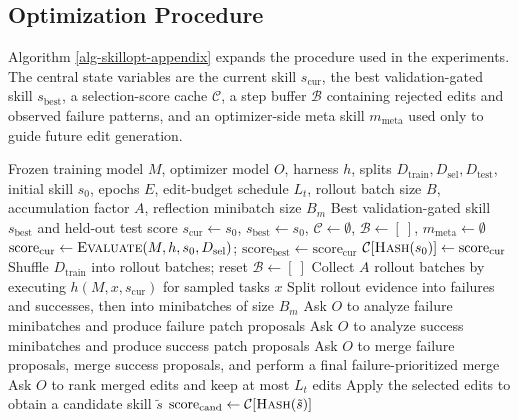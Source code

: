 \documentclass[
]{article}
\newcommand{\ourmethod}{\textsc{SkillOpt}\xspace}
\begin{document}
\subsection{Optimization Procedure}\label{sec-app-algorithm}

Algorithm \ref{alg-skillopt-appendix} expands the procedure used in the
experiments. The central state variables are the current skill
\(s_{\mathrm{cur}}\), the best validation-gated skill
\(s_{\mathrm{best}}\), a selection-score cache \(\mathcal{C}\), a step
buffer \(\mathcal{B}\) containing rejected edits and observed failure
patterns, and an optimizer-side meta skill \(m_{\mathrm{meta}}\) used
only to guide future edit generation.

\begin{algorithm}[t]
\caption{\ourmethod{} skill optimization}
\label{alg-skillopt-appendix}
\begin{algorithmic}[1]
\Require Frozen training model $M$, optimizer model $O$, harness $h$, splits $D_\mathrm{train},D_\mathrm{sel},D_\mathrm{test}$, initial skill $s_0$, epochs $E$, edit-budget schedule $L_t$, rollout batch size $B$, accumulation factor $A$, reflection minibatch size $B_m$
\Ensure Best validation-gated skill $s_\mathrm{best}$ and held-out test score
\State $s_\mathrm{cur} \gets s_0$, $s_\mathrm{best} \gets s_0$, $\mathcal{C} \gets \emptyset$, $\mathcal{B} \gets [\ ]$, $m_\mathrm{meta} \gets \emptyset$ 
\State $\mathrm{score}_\mathrm{cur} \gets \Call{Evaluate}{M,h,s_0,D_\mathrm{sel}}$; $\mathrm{score}_\mathrm{best} \gets \mathrm{score}_\mathrm{cur}$
\State $\mathcal{C}[\Call{Hash}{s_0}] \gets \mathrm{score}_\mathrm{cur}$
    \State Shuffle $D_\mathrm{train}$ into rollout batches; reset $\mathcal{B} \gets [\ ]$
        \State Collect $A$ rollout batches by executing $h(M,x,s_\mathrm{cur})$ for sampled tasks $x$
        \State Split rollout evidence into failures and successes, then into minibatches of size $B_m$
        \State Ask $O$ to analyze failure minibatches and produce failure patch proposals
        \State Ask $O$ to analyze success minibatches and produce success patch proposals
        \State Ask $O$ to merge failure proposals, merge success proposals, and perform a final failure-prioritized merge
        \State Ask $O$ to rank merged edits and keep at most $L_t$ edits
        \State Apply the selected edits to obtain a candidate skill $\tilde{s}$
            \State $\mathrm{score}_\mathrm{cand} \gets \mathcal{C}[\Call{Hash}{\tilde{s}}]$

\end{algorithmic}
\end{algorithm}
\end{document}
